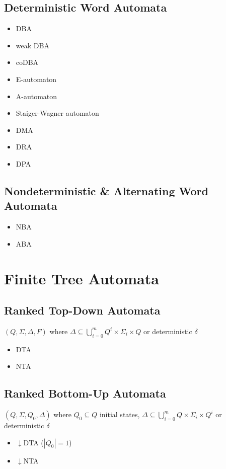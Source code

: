 \documentclass{article}
\begin{document}
\subsection{Deterministic Word Automata}
\begin{itemize}
	\item DBA
	\item weak DBA
	\item coDBA
	\item E-automaton
	\item A-automaton
	\item Staiger-Wagner automaton
	\item DMA
	\item DRA
	\item DPA
\end{itemize}

\subsection{Nondeterministic \& Alternating Word Automata}
\begin{itemize}
	\item NBA
	\item ABA
\end{itemize}



\newpage
\section{Finite Tree Automata}
\subsection{Ranked Top-Down Automata}
$(Q, \Sigma, \Delta, F)$ where $\Delta \subseteq \bigcup\limits_{i=0}^m Q^i \times \Sigma_i \times Q$ or deterministic $\delta$

\begin{itemize}
	\item DTA
	\item NTA
\end{itemize}

\subsection{Ranked Bottom-Up Automata}
$(Q, \Sigma, Q_0, \Delta)$ where $Q_0 \subseteq Q$ initial states, $\Delta \subseteq \bigcup\limits_{i=0}^m Q \times \Sigma_i \times Q^i$ or deterministic $\delta$

\begin{itemize}
	\item $\downarrow$DTA ($|Q_0| = 1$)
	\item $\downarrow$NTA
\end{itemize}
\end{document}
